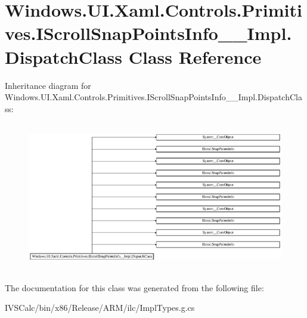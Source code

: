 \hypertarget{class_windows_1_1_u_i_1_1_xaml_1_1_controls_1_1_primitives_1_1_i_scroll_snap_points_info_____impl_1_1_dispatch_class}{}\section{Windows.\+U\+I.\+Xaml.\+Controls.\+Primitives.\+I\+Scroll\+Snap\+Points\+Info\+\_\+\+\_\+\+Impl.\+Dispatch\+Class Class Reference}
\label{class_windows_1_1_u_i_1_1_xaml_1_1_controls_1_1_primitives_1_1_i_scroll_snap_points_info_____impl_1_1_dispatch_class}
Inheritance diagram for Windows.\+U\+I.\+Xaml.\+Controls.\+Primitives.\+I\+Scroll\+Snap\+Points\+Info\+\_\+\+\_\+\+Impl.\+Dispatch\+Class\+:\begin{figure}[H]
\begin{center}
\leavevmode
\includegraphics[height=6.553191cm]{class_windows_1_1_u_i_1_1_xaml_1_1_controls_1_1_primitives_1_1_i_scroll_snap_points_info_____impl_1_1_dispatch_class}
\end{center}
\end{figure}


The documentation for this class was generated from the following file\+:\begin{DoxyCompactItemize}
\item 
I\+V\+S\+Calc/bin/x86/\+Release/\+A\+R\+M/ilc/Impl\+Types.\+g.\+cs\end{DoxyCompactItemize}
